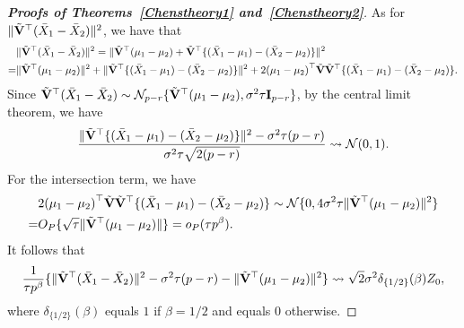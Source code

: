 \documentclass[times,sort&compress,3p]{elsarticle}
\theoremstyle{plain}
\theoremstyle{definition}
\theoremstyle{remark}
\begin{document}
\begin{appendices}
\begin{proof}[\textbf{Proofs of Theorems~\ref{Chenstheory1} and~\ref{Chenstheory2}}]
    As for $\|\tilde{\mathbf{V}}^\top (\bar{X}_1-\bar{X}_2)\|^2$, we have that
        \begin{align*}
            &\|\tilde{\mathbf{V}}^\top (\bar{X}_1-\bar{X}_2)\|^2
            =\|\tilde{\mathbf{V}}^\top (\mu_1-\mu_2)+\tilde{\mathbf{V}}^\top \{(\bar{X}_1-\mu_1)-(\bar{X}_2-\mu_2)\}\|^2\\
            =&\|\tilde{\mathbf{V}}^\top (\mu_1-\mu_2)\|^2+
        \|\tilde{\mathbf{V}}^\top \{(\bar{X}_1-\mu_1)-(\bar{X}_2-\mu_2)\}\|^2+
        2{(\mu_1-\mu_2)}^\top \tilde{\mathbf{V}}\tilde{\mathbf{V}}^\top \{(\bar{X}_1-\mu_1)-(\bar{X}_2-\mu_2)\}.
        \end{align*}
    Since $\tilde{\mathbf{V}}^\top  (\bar{X}_1-\bar{X}_2)\sim \mathcal{N}_{p-r}\{\tilde{\mathbf{V}}^\top  (\mu_1-\mu_2),  \sigma^2 \tau \mathbf{I}_{p-r}\}$, by the central limit theorem, we have
    $$
\frac{
\|\tilde{\mathbf{V}}^\top \{(\bar{X}_1-\mu_1)-(\bar{X}_2-\mu_2)\}\|^2-\sigma^2 \tau (p-r)}{\sigma^2 \tau\sqrt{2(p-r)}}\rightsquigarrow  \mathcal{N}(0,1).
    $$
    For the intersection term, we have
        \begin{align*}
            &2{(\mu_1-\mu_2)}^\top \tilde{\mathbf{V}}\tilde{\mathbf{V}}^\top \{(\bar{X}_1-\mu_1)-(\bar{X}_2-\mu_2)\}
            \sim \mathcal{N}\{0,4\sigma^2 \tau \|\tilde{\mathbf{V}}^\top (\mu_1-\mu_2)\|^2\}\\
            =& O_P\{\sqrt{\tau}\|\tilde{\mathbf{V}}^\top (\mu_1-\mu_2)\| \}=o_P(\tau p^{\beta}).
        \end{align*}
    It follows that
    \begin{equation}\label{eq:kkk3}
\frac{1}{\tau p^\beta}
\{\|\tilde{\mathbf{V}}^\top (\bar{X}_1-\bar{X}_2)\|^2-\sigma^2 \tau (p-r)-\|\tilde{\mathbf{V}}^\top (\mu_1-\mu_2)\|^2\}
    \rightsquigarrow  
        \sqrt{2}\sigma^2 \delta_{\{{1}/{2}\}}(\beta)Z_0,
    \end{equation}
    where $\delta_{\{{1}/{2}\}}(\beta)$ equals $1$ if $\beta=1/2$ and equals $0$ otherwise.



\end{proof}
\end{appendices}
\end{document}
